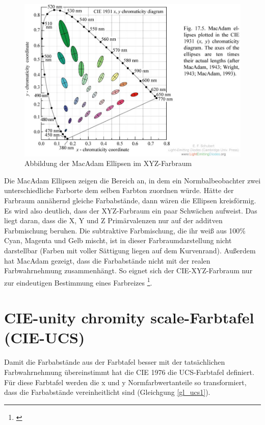 \begin{figure}[H]     %
\centering
\includegraphics[width=1.0\textwidth]{bilder/ellipsen} 
\caption {Abbildung der MacAdam Ellipsen im XYZ-Farbraum\protect\footnotemark}\label{b_ellipsen}
\end{figure}

\noindent Die MacAdam Ellipsen zeigen die Bereich an, in dem ein Normbalbeobachter zwei unterschiedliche Farborte dem selben Farbton zuordnen würde. Hätte der Farbraum annähernd gleiche Farbabstände, dann wären die Ellipsen kreisförmig.\\
Es wird also deutlich, dass der XYZ-Farbraum ein paar Schwächen aufweist. Das liegt daran, dass die X, Y und Z Primärvalenzen nur auf der additven Farbmischung beruhen. Die subtraktive Farbmischung, die ihr weiß aus 100\% Cyan, Magenta und Gelb mischt, ist in dieser Farbraumdarstellung nicht darstellbar (Farben  mit voller Sättigung liegen auf dem Kurvenrand). Außerdem hat MacAdam gezeigt, dass die Farbabstände nicht mit der realen Farbwahrnehmung zusammenhängt. So eignet sich der CIE-XYZ-Farbraum nur zur eindeutigen Bestimmung eines Farbreizes \footnote{\cite[79-80]{greule}}.


\section{CIE-unity chromity scale-Farbtafel (CIE-UCS)} \label{sec_ucs}
Damit die Farbabstände aus der Farbtafel besser mit der tatsächlichen Farbwahrnehmung übereinstimmt hat die CIE 1976 die UCS-Farbtafel definiert. Für diese Farbtafel werden die x und y Normfarbwertanteile so transformiert, dass die Farbabstände vereinheitlicht sind (Gleichgung \ref{gl_ucs1}).


